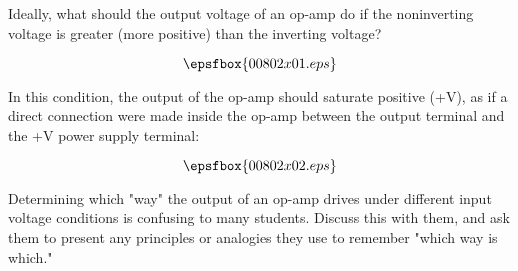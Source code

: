 

Ideally, what should the output voltage of an op-amp do if the noninverting voltage is greater (more positive) than the inverting voltage?

$$\epsfbox{00802x01.eps}$$







In this condition, the output of the op-amp should saturate positive (+V), as if a direct connection were made inside the op-amp between the output terminal and the +V power supply terminal:

$$\epsfbox{00802x02.eps}$$







Determining which "way" the output of an op-amp drives under different input voltage conditions is confusing to many students.  Discuss this with them, and ask them to present any principles or analogies they use to remember "which way is which."




